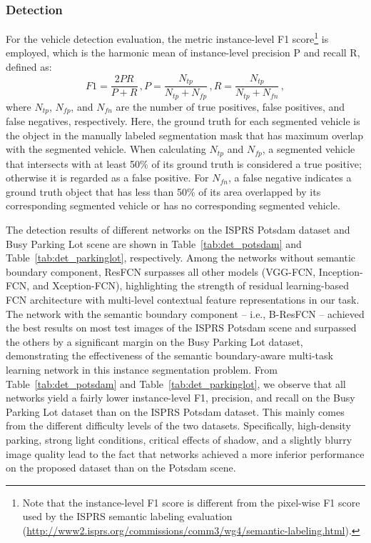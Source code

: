 \documentclass[journal]{IEEEtran}
\begin{document}
\subsubsection{\textbf{Detection}}
For the vehicle detection evaluation, the metric instance-level F1 score\footnote{Note that the instance-level F1 score is different from the pixel-wise F1 score used by the ISPRS semantic labeling evaluation (\url{http://www2.isprs.org/commissions/comm3/wg4/semantic-labeling.html}).} is employed, which is the harmonic mean of instance-level precision P and recall R, defined as:
\begin{equation}\label{eq:f1}
F1=\frac{2PR}{P+R}\,,
P=\frac{N_{tp}}{N_{tp}+N_{fp}}\,,
R=\frac{N_{tp}}{N_{tp}+N_{fn}}\,,
\end{equation}
where $N_{tp}$, $N_{fp}$, and $N_{fn}$ are the number of true positives, false positives, and false negatives, respectively. Here, the ground truth for each segmented vehicle is the object in the manually labeled segmentation mask that has maximum overlap with the segmented vehicle. When calculating $N_{tp}$ and $N_{fp}$, a segmented vehicle that intersects with at least 50\% of its ground truth is considered a true positive; otherwise it is regarded as a false positive. For $N_{fn}$, a false negative indicates a ground truth object that has less than 50\% of its area overlapped by its corresponding segmented vehicle or has no corresponding segmented vehicle.
\par
The detection results of different networks on the ISPRS Potsdam dataset and Busy Parking Lot scene are shown in Table~\ref{tab:det_potsdam} and Table~\ref{tab:det_parkinglot}, respectively. Among the networks without semantic boundary component, ResFCN surpasses all other models (VGG-FCN, Inception-FCN, and Xception-FCN), highlighting the strength of residual learning-based FCN architecture with multi-level contextual feature representations in our task. The network with the semantic boundary component -- i.e., B-ResFCN -- achieved the best results on most test images of the ISPRS Potsdam scene and surpassed the others by a significant margin on the Busy Parking Lot dataset, demonstrating the effectiveness of the semantic boundary-aware multi-task learning network in this instance segmentation problem. From Table~\ref{tab:det_potsdam} and Table~\ref{tab:det_parkinglot}, we observe that all networks yield a fairly lower instance-level F1, precision, and recall on the Busy Parking Lot dataset than on the ISPRS Potsdam dataset. This mainly comes from the different difficulty levels of the two datasets. Specifically, high-density parking, strong light conditions, critical effects of shadow, and a slightly blurry image quality lead to the fact that networks achieved a more inferior performance on the proposed dataset than on the Potsdam scene.
\end{document}
